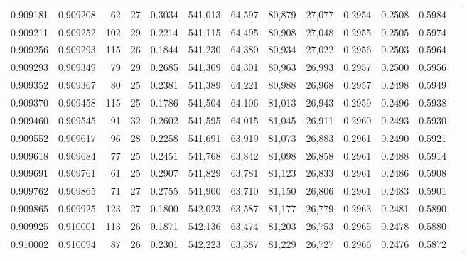 \begin{tabular}{rrrrrrrrrrrrr}
0.909181 & 0.909208 &    62 &  27 &                                     0.3034 & 541,013 &  64,597 &  80,879 &  27,077 & 0.2954 & 0.2508 & 0.5984 \\
0.909211 & 0.909252 &   102 &  29 &                                     0.2214 & 541,115 &  64,495 &  80,908 &  27,048 & 0.2955 & 0.2505 & 0.5974 \\
0.909256 & 0.909293 &   115 &  26 &                                     0.1844 & 541,230 &  64,380 &  80,934 &  27,022 & 0.2956 & 0.2503 & 0.5964 \\
0.909293 & 0.909349 &    79 &  29 &                                     0.2685 & 541,309 &  64,301 &  80,963 &  26,993 & 0.2957 & 0.2500 & 0.5956 \\
0.909352 & 0.909367 &    80 &  25 &                                     0.2381 & 541,389 &  64,221 &  80,988 &  26,968 & 0.2957 & 0.2498 & 0.5949 \\
0.909370 & 0.909458 &   115 &  25 &                                     0.1786 & 541,504 &  64,106 &  81,013 &  26,943 & 0.2959 & 0.2496 & 0.5938 \\
0.909460 & 0.909545 &    91 &  32 &                                     0.2602 & 541,595 &  64,015 &  81,045 &  26,911 & 0.2960 & 0.2493 & 0.5930 \\
0.909552 & 0.909617 &    96 &  28 &                                     0.2258 & 541,691 &  63,919 &  81,073 &  26,883 & 0.2961 & 0.2490 & 0.5921 \\
0.909618 & 0.909684 &    77 &  25 &                                     0.2451 & 541,768 &  63,842 &  81,098 &  26,858 & 0.2961 & 0.2488 & 0.5914 \\
0.909691 & 0.909761 &    61 &  25 &                                     0.2907 & 541,829 &  63,781 &  81,123 &  26,833 & 0.2961 & 0.2486 & 0.5908 \\
0.909762 & 0.909865 &    71 &  27 &                                     0.2755 & 541,900 &  63,710 &  81,150 &  26,806 & 0.2961 & 0.2483 & 0.5901 \\
0.909865 & 0.909925 &   123 &  27 &                                     0.1800 & 542,023 &  63,587 &  81,177 &  26,779 & 0.2963 & 0.2481 & 0.5890 \\
0.909925 & 0.910001 &   113 &  26 &                                     0.1871 & 542,136 &  63,474 &  81,203 &  26,753 & 0.2965 & 0.2478 & 0.5880 \\
0.910002 & 0.910094 &    87 &  26 &                                     0.2301 & 542,223 &  63,387 &  81,229 &  26,727 & 0.2966 & 0.2476 & 0.5872 \\

\end{tabular}
